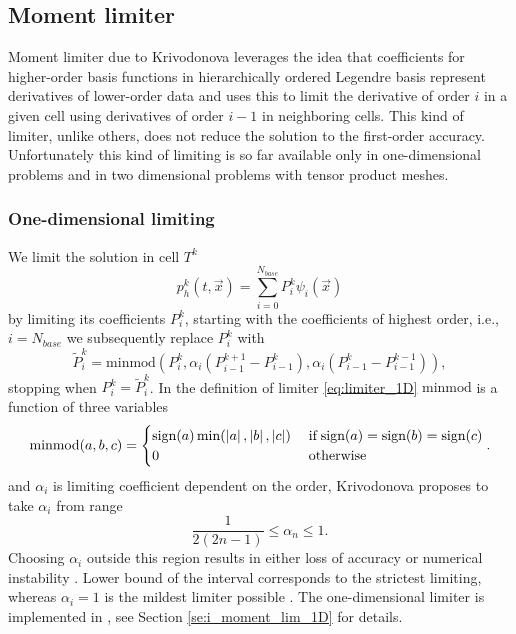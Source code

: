 \subsection{Moment limiter}
Moment limiter due to Krivodonova \cite{Krivodonova2007} leverages the idea that 
coefficients for higher-order basis functions in hierarchically ordered 
Legendre basis represent derivatives of lower-order data and uses this to 
limit the derivative of order $i$ in a given cell using derivatives of order 
$i - 1$ in neighboring cells. This kind of limiter, unlike others, does not 
reduce the solution to the first-order accuracy. Unfortunately this kind of 
limiting is so far available only in one-dimensional problems and in two 
dimensional problems with tensor product meshes.

\subsubsection{One-dimensional limiting}
\label{sse:moment_lim_1D}
We limit the solution in cell $T^k$
\begin{equation}
\label{eq:el_lin_comb_lim}
p_h^k(t, \vec{x}) = \sum\limits_{i=0}^{N_{base}} P_i^k\psi_i(\vec{x})
\end{equation}
by limiting its coefficients $P_i^k$, starting with the coefficients of 
highest order, i.e., $i = N_{base}$ we subsequently replace 
$P_i^k$ with
\begin{equation}
\label{eq:limiter_1D}
\tilde{P}_i^k = \text{minmod}\left(P_i^k, 
\alpha_i(P_{i-1}^{k+1} - P_{i-1}^k), 
\alpha_i (P_{i-1}^k - P_{i-1}^{k-1})\right),
\end{equation}
stopping when $P_i^k = \tilde{P}_i^k$. In the definition of limiter \eqref{eq:limiter_1D} 
$\text{minmod}$ is a function of three 
variables
\begin{equation}
\text{minmod}(a,b,c) = 
\begin{cases}
\text{sign}(a)\min(\left\lvert a\right\rvert, \left\lvert b\right\rvert, \left\lvert c\right\rvert) & \;\text{if}\;     
\text{sign}(a) =
\text{sign}(b) = 
\text{sign}(c)\\
0 & \;\text{otherwise}
\end{cases}.
\end{equation}
and $\alpha_i$ is limiting coefficient dependent on the order, Krivodonova 
\cite{Krivodonova2007} proposes to take $\alpha_i$ from range
\begin{equation}
\frac{1}{2(2n -1)} \leq \alpha_n \leq 1.
\end{equation}
Choosing $\alpha_i$ outside this region results in either loss of accuracy or numerical 
instability \cite[p. 882]{Krivodonova2007}. Lower bound of the interval corresponds to 
the strictest limiting, whereas $\alpha_i = 1$ is the mildest limiter possible \cite[p. 
882]{Krivodonova2007}. The one-dimensional limiter is implemented in 
, see Section \ref{se:i_moment_lim_1D} for details.

